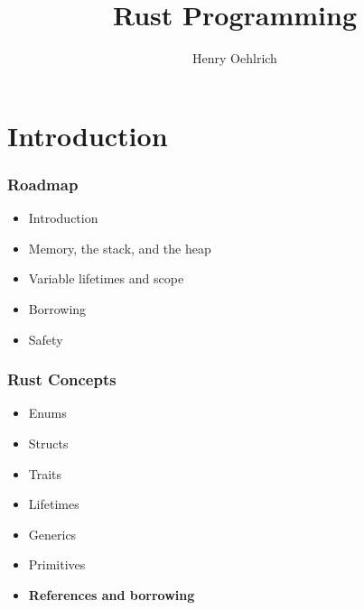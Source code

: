 \documentclass{beamer}
\title{Rust Programming}
\author{Henry Oehlrich}
\begin{document}
\maketitle{}

\section{Introduction}
\begin{frame}
	\frametitle{Roadmap}
	\begin{itemize}
        \item Introduction
        \item Memory, the stack, and the heap
        \item Variable lifetimes and scope
        \item Borrowing
        \item Safety
	\end{itemize}
\end{frame}
\begin{frame}
    \frametitle{Rust Concepts}
    \begin{itemize}
        \item Enums
        \item Structs
        \item Traits
        \item Lifetimes
        \item Generics
        \item Primitives
        \item \textbf{References and borrowing}
    \end{itemize}
\end{frame}
\end{document}
